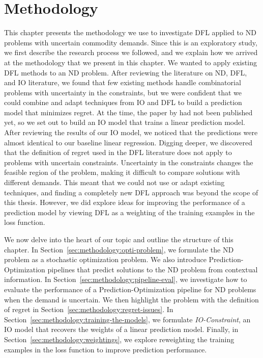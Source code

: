 \chapter{Methodology} \label{sec:methodology}

This chapter presents the methodology we use to investigate DFL applied to ND problems with uncertain commodity demands. Since this is an exploratory study, we first describe the research process we followed, and we explain how we arrived at the methodology that we present in this chapter. We wanted to apply existing DFL methods to an ND problem. After reviewing the literature on ND, DFL, and IO literature, we found that few existing methods handle combinatorial problems with uncertainty in the constraints, but we were confident that we could combine and adapt techniques from IO and DFL to build a prediction model that minimizes regret. At the time, the paper by \cite{sunMaximumOptimalityMargin2023} had not been published yet, so we set out to build an IO model that trains a linear prediction model. After reviewing the results of our IO model, we noticed that the predictions were almost identical to our baseline linear regression. Digging deeper, we discovered that the definition of regret used in the DFL literature does not apply to problems with uncertain constraints. 
Uncertainty in the constraints changes the feasible region of the problem, making it difficult to compare solutions with different demands. This meant that we could not use or adapt existing techniques, and finding a completely new DFL approach was beyond the scope of this thesis. However, we did explore ideas for improving the performance of a prediction model by viewing DFL as a weighting of the training examples in the loss function. 

We now delve into the heart of our topic and outline the structure of this chapter. In Section~\ref{sec:methodology:opti-problem}, we formulate the ND problem as a stochastic optimization problem. We also introduce Prediction-Optimization pipelines that predict solutions to the ND problem from contextual information. In Section~\ref{sec:methodology:pipeline-eval}, we investigate how to evaluate the performance of a Prediction-Optimization pipeline for ND problems when the demand is uncertain. We then highlight the problem with the definition of regret in Section~\ref{sec:methodology:regret-issues}. In Section~\ref{sec:methodology:training-the-models}, we formulate \textit{IO-Constraint}, an IO model that recovers the weights of a linear prediction model.
Finally, in Section~\ref{sec:methodology:weightings}, we explore reweighting the training examples in the loss function to improve prediction performance.

